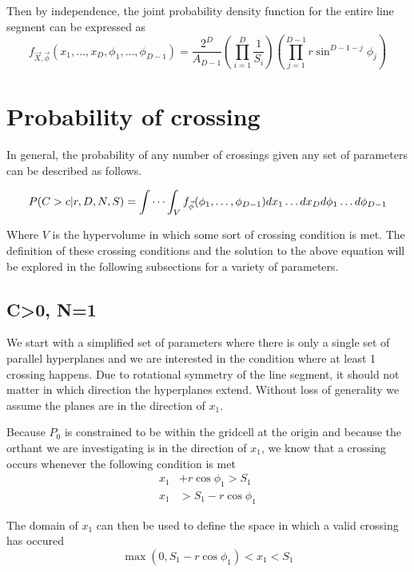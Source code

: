 \documentclass{article}
\begin{document}
Then by independence, the joint probability density function for the entire line segment can be expressed as 
\begin{equation} \label{eq:general pdf}
	f_{\vec{X},\vec{\phi}}(x_1, \hdots, x_D, \phi_1, \hdots, \phi_{D-1}) = \frac{2^D}{A_{D-1}}\left(\prod_{i=1}^D\frac{1}{S_i}\right)\left(\prod_{j=1}^{D-1}r\sin^{D-1-j}\phi_j\right)
\end{equation} 

\section{Probability of crossing}
In general, the probability of any number of crossings given any set of parameters can be described as follows.

\begin{equation} \label{eq:volume integral}
	P(C>c|r, D, N, S)=\idotsint_V f_{\vec\phi}(\phi_1,\hdots,\phi_{D-1})dx_1 \hdots dx_D d\phi_1 \hdots d\phi_{D-1}
\end{equation}

Where $V$ is the hypervolume in which some sort of crossing condition is met. The definition of these crossing conditions and the solution to the above equation will be
explored in the following subsections for a variety of parameters.

\subsection{C>0, N=1}
We start with a simplified set of parameters where there is only a single set of parallel hyperplanes and we are interested in the condition where at least 1 crossing happens. 
Due to rotational symmetry of the line segment, it should not matter in which direction the hyperplanes extend. Without loss of generality we assume the planes are in the
direction of $x_1$.

Because $P_0$ is constrained to be within the gridcell at the origin and because the orthant we are investigating is in the direction of $x_1$, we know that a crossing occurs
whenever the following condition is met
\begin{align}
	x_1 &+ r\cos{\phi_1} > S_1\\
	x_1 &> S_1 - r\cos{\phi_1}
\end{align}

The domain of $x_1$ can then be used to define the space in which a valid crossing has occured 
\begin{equation} \label{eq:crossing condition 0}
	\max(0, S_1-r\cos{\phi_1}) < x_1 < S_1
\end{equation}
\end{document}
